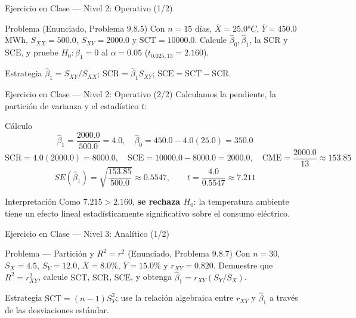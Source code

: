 \documentclass[10pt, aspectratio=169]{beamer}
\begin{document}
\begin{frame}{Ejercicio en Clase --- Nivel 2: Operativo (1/2)}
  \footnotesize
  \begin{block}{Problema (Enunciado, Problema 9.8.5)}
    Con $n=15$ días, $\bar X=25.0°C$, $\bar Y=450.0$ MWh, $S_{XX}=500.0$, $S_{XY}=2000.0$ y $\text{SCT}=10000.0$. Calcule $\hat\beta_0,\hat\beta_1$, la $\text{SCR}$ y $\text{SCE}$, y pruebe $H_0:\beta_1=0$ al $\alpha=0.05$ ($t_{0.025,13}=2.160$).
  \end{block}

  \vspace{0.15cm}
  \pause
  \begin{alertblock}{Estrategia}
    \scriptsize
    $\hat\beta_1=S_{XY}/S_{XX}$; $\text{SCR}=\hat\beta_1 S_{XY}$; $\text{SCE}=\text{SCT}-\text{SCR}$.
  \end{alertblock}
\end{frame}

\begin{frame}{Ejercicio en Clase --- Nivel 2: Operativo (2/2)}
  \scriptsize
  Calculamos la pendiente, la partición de varianza y el estadístico $t$: \pause

  \vspace{0.05cm}
  \begin{block}{Cálculo}
    $$\hat\beta_1=\frac{2000.0}{500.0}=4.0, \quad \hat\beta_0=450.0-4.0(25.0)=350.0$$
    $$\text{SCR}=4.0(2000.0)=8000.0, \quad \text{SCE}=10000.0-8000.0=2000.0, \quad \text{CME}=\frac{2000.0}{13}\approx153.85$$
    $$SE(\hat\beta_1)=\sqrt{\frac{153.85}{500.0}}\approx0.5547, \qquad t=\frac{4.0}{0.5547}\approx7.211$$
  \end{block}

  \vspace{0.05cm}
  \pause
  \begin{alertblock}{Interpretación}
    \scriptsize
    Como $7.215>2.160$, \textbf{se rechaza $H_0$}: la temperatura ambiente tiene un efecto lineal estadísticamente significativo sobre el consumo eléctrico.
  \end{alertblock}
\end{frame}

\begin{frame}{Ejercicio en Clase --- Nivel 3: Analítico (1/2)}
  \footnotesize
  \begin{block}{Problema --- Partición y $R^2=r^2$ (Enunciado, Problema 9.8.7)}
    Con $n=30$, $S_X=4.5$, $S_Y=12.0$, $\bar X=8.0\%$, $\bar Y=15.0\%$ y $r_{XY}=0.820$. Demuestre que $R^2=r_{XY}^2$, calcule $\text{SCT}$, $\text{SCR}$, $\text{SCE}$, y obtenga $\hat\beta_1=r_{XY}(S_Y/S_X)$.
  \end{block}

  \vspace{0.1cm}
  \pause
  \begin{alertblock}{Estrategia}
    \scriptsize
    $\text{SCT}=(n-1)S_Y^2$; use la relación algebraica entre $r_{XY}$ y $\hat\beta_1$ a través de las desviaciones estándar.
  \end{alertblock}
\end{frame}
\end{document}
